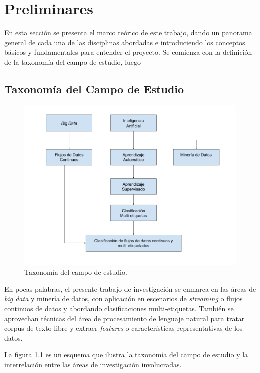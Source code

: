 \chapter{Preliminares}


En esta sección se presenta el marco teórico de este trabajo, dando un panorama
general de cada una de las disciplinas abordadas e introduciendo los conceptos
básicos y fundamentales para entender el proyecto. Se comienza con la definición
de la taxonomía del campo de estudio, luego 

\section{Taxonomía del Campo de Estudio}

\begin{figure}
   \includegraphics[width=.9\linewidth]{figures/study_field_taxonomy_v2.png}
   \centering
   \caption{Taxonomía del campo de estudio.}
   \label{fig:campo_estudio}
\end{figure}

En pocas palabras, el presente trabajo de investigación se enmarca en las áreas
de \textit{big data} y minería de datos, con aplicación en escenarios de
\textit{streaming} o flujos continuos de datos y abordando clasificaciones
multi-etiquetas. También se aprovechan técnicas del área de procesamiento de
lenguaje natural para tratar corpus de texto libre y extraer \textit{features} o
características representativas de los datos.

La figura \ref{fig:campo_estudio} es un esquema que ilustra la taxonomía del
campo de estudio y la interrelación entre las áreas de investigación
involucradas.

